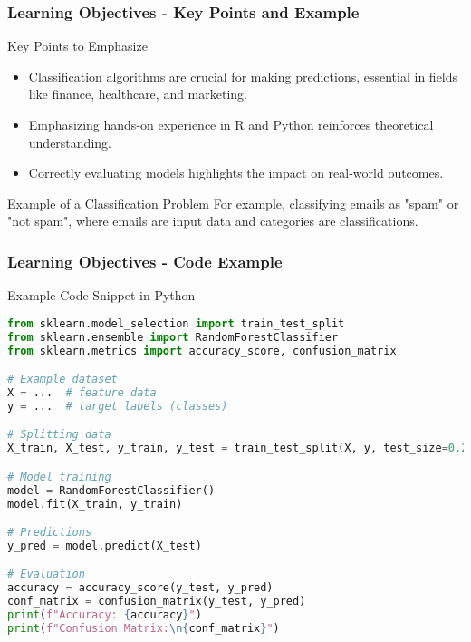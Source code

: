\documentclass{beamer}
\begin{document}
\begin{frame}[fragile]
    \frametitle{Learning Objectives - Key Points and Example}
    \begin{block}{Key Points to Emphasize}
        \begin{itemize}
            \item Classification algorithms are crucial for making predictions, essential in fields like finance, healthcare, and marketing.
            \item Emphasizing hands-on experience in R and Python reinforces theoretical understanding.
            \item Correctly evaluating models highlights the impact on real-world outcomes.
        \end{itemize}
    \end{block}
    
    \begin{block}{Example of a Classification Problem}
        For example, classifying emails as "spam" or "not spam", where emails are input data and categories are classifications.
    \end{block}
\end{frame}

\begin{frame}[fragile]
    \frametitle{Learning Objectives - Code Example}
    \begin{block}{Example Code Snippet in Python}
    \begin{lstlisting}[language=Python]
from sklearn.model_selection import train_test_split
from sklearn.ensemble import RandomForestClassifier
from sklearn.metrics import accuracy_score, confusion_matrix

# Example dataset
X = ...  # feature data
y = ...  # target labels (classes)

# Splitting data
X_train, X_test, y_train, y_test = train_test_split(X, y, test_size=0.2)

# Model training
model = RandomForestClassifier()
model.fit(X_train, y_train)

# Predictions
y_pred = model.predict(X_test)

# Evaluation
accuracy = accuracy_score(y_test, y_pred)
conf_matrix = confusion_matrix(y_test, y_pred)
print(f"Accuracy: {accuracy}")
print(f"Confusion Matrix:\n{conf_matrix}")
    \end{lstlisting}
    \end{block}
\end{frame}
\end{document}
